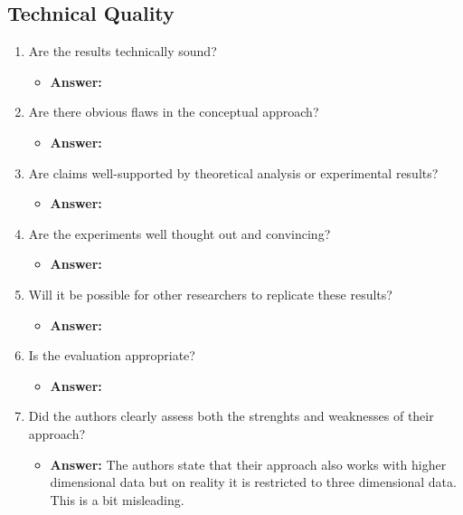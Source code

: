 \documentclass[a4paper]{article}
\begin{document}
\subsection{Technical Quality}

\begin{enumerate}[label=(\alph*)]
	\item Are the results technically sound?
		\begin{itemize}
			\item \textbf{Answer:}	
		\end{itemize}			
	
	
	\item Are there obvious flaws in the conceptual approach?
		\begin{itemize}
			\item \textbf{Answer:}	
		\end{itemize}		
	
	
	\item Are claims well-supported by theoretical analysis or experimental results?
		\begin{itemize}
			\item \textbf{Answer:}	
		\end{itemize}		
	
	\item Are the experiments well thought out and convincing?
		\begin{itemize}
			\item \textbf{Answer:}	
		\end{itemize}		
	
	
	\item Will it be possible for other researchers to replicate these results?
		\begin{itemize}
			\item \textbf{Answer:}	
		\end{itemize}		
	
	
	\item Is the evaluation appropriate?
		\begin{itemize}
			\item \textbf{Answer:}	
		\end{itemize}		
	
	
	\item Did the authors clearly assess both the strenghts and weaknesses of their approach?
		\begin{itemize}
			\item \textbf{Answer:} The authors state that their approach also works with higher dimensional data but on reality it is restricted to three dimensional data. This is a bit misleading.
		\end{itemize}		
	
\end{enumerate}
\end{document}
